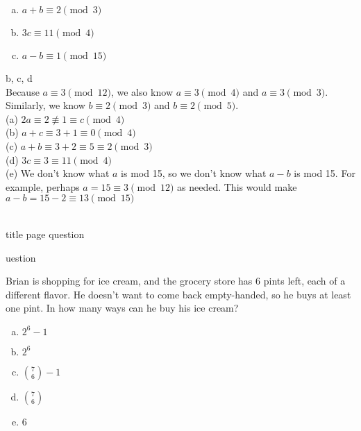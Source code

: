 \begin{solution}
\begin{enumerate}[(a)]
\begin{enumerate}[(a)]
	\item  $a + b \equiv 2 \pmod{3}$

	\item  $3c \equiv 11 \pmod{4}$

	\item  $a - b \equiv 1 \pmod{15}$

\end{enumerate}
\begin{solution}

b, c, d\\
Because $a\equiv 3\pmod {12}$, we also know $a\equiv 3\pmod 4$ and $a\equiv 3\pmod 3$.  Similarly, we know $b\equiv 2\pmod 3$ and $b\equiv 2\pmod 5$.\\
(a) $2a\equiv 2\not\equiv1\equiv c\pmod 4$\\
(b) $a+c\equiv 3+1\equiv 0\pmod 4$\\
(c) $a+b\equiv 3+2\equiv 5\equiv 2\pmod 3$\\
(d) $3c\equiv 3\equiv 11\pmod 4$\\
(e) We don't know what $a$ is mod 15, so we don't know what $a-b$ is mod 15.  For example, perhaps $a=15\equiv 3\pmod {12}$ as needed.  This would make $a-b= 15-2\equiv 13\pmod {15}$  

\end{solution}
\\
title page question

\begin{enumerate}[(a)]
\end{enumerate}
\begin{solution}
uestion


\end{solution}


Brian is shopping for ice cream, and the grocery store has 6 pints left, each of a different flavor. He doesn't want to come back empty-handed, so he buys at least one pint. In how many ways can he buy his ice cream?

\begin{enumerate}[(a)]
	\item  $2^6-1$

	\item  $2^6$

	\item  $\binom{7}{6}-1$

	\item  $\binom{7}{6}$

	\item  $6$


\end{enumerate}
\end{enumerate}
\end{solution}

